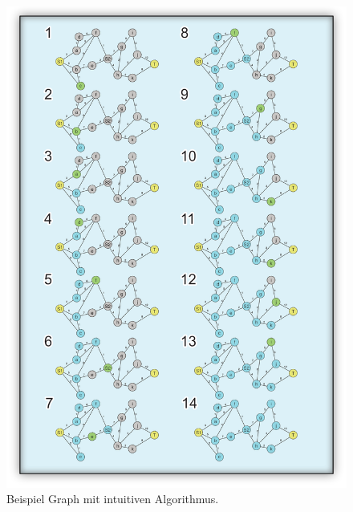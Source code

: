\begin{figure}[h!]
	\centering
	\includegraphics[scale=0.76]{chapters/informed_search/BeispielGraphen2.png}
	\caption{Beispiel Graph mit intuitiven Algorithmus.}
\end{figure}

